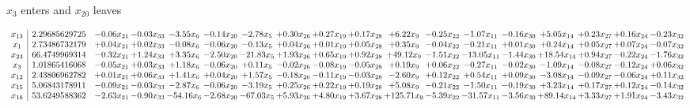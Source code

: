 \documentclass[9pt]{article}
\begin{document}
 $ x_{3} $ enters and $ x_{20} $ leaves 

 \[\begin{array}{c| c c@{\hskip 2pt} c@{\hskip 2pt} c@{\hskip 2pt} c@{\hskip 2pt} c@{\hskip 2pt} c@{\hskip 2pt} c@{\hskip 2pt} c@{\hskip 2pt} c@{\hskip 2pt} c@{\hskip 2pt} c@{\hskip 2pt} c@{\hskip 2pt} c@{\hskip 2pt} c@{\hskip 2pt} c@{\hskip 2pt} c@{\hskip 2pt} }
 x_{13}   &  2.29685629725 & -0.06 x_{21} & -0.03 x_{33} & -3.55 x_{6} & -0.14 x_{20} & -2.78 x_{5} & +  0.30 x_{26} & +  0.27 x_{19} & +  0.17 x_{28} & +  6.22 x_{9} & -0.25 x_{22} & -1.07 x_{11} & -0.16 x_{30} & +  5.05 x_{14} & +  0.23 x_{27} & +  0.16 x_{24} & -0.23 x_{32}\\
 x_{1}   &  2.73486732179 & +  0.04 x_{21} & +  0.02 x_{33} & -0.08 x_{6} & -0.06 x_{20} & -0.13 x_{5} & +  0.04 x_{26} & +  0.01 x_{19} & +  0.05 x_{28} & +  0.35 x_{9} & -0.04 x_{22} & -0.21 x_{11} & +  0.01 x_{30} & +  0.24 x_{14} & +  0.05 x_{27} & +  0.07 x_{24} & -0.07 x_{32}\\
 x_{23}   &  66.4749969314 & -0.32 x_{21} & +  1.24 x_{33} & +  3.35 x_{6} & -2.50 x_{20} & -21.83 x_{5} & +  1.93 x_{26} & +  0.65 x_{19} & +  0.92 x_{28} & + 49.12 x_{9} & -1.51 x_{22} & -13.05 x_{11} & -1.44 x_{30} & + 18.54 x_{14} & +  0.94 x_{27} & -0.22 x_{24} & -1.76 x_{32}\\
 x_{3}   &  1.01865416068 & -0.05 x_{21} & +  0.03 x_{33} & +  1.18 x_{6} & -0.06 x_{20} & +  0.11 x_{5} & -0.02 x_{26} & -0.08 x_{19} & -0.05 x_{28} & +  0.19 x_{9} & +  0.06 x_{22} & -0.27 x_{11} & -0.02 x_{30} & -1.09 x_{14} & -0.08 x_{27} & -0.12 x_{24} & +  0.06 x_{32}\\
 x_{12}   &  2.43806962782 & +  0.01 x_{21} & +  0.06 x_{33} & +  1.41 x_{6} & +  0.04 x_{20} & +  1.57 x_{5} & -0.18 x_{26} & -0.11 x_{19} & -0.03 x_{28} & -2.60 x_{9} & +  0.12 x_{22} & +  0.54 x_{11} & +  0.09 x_{30} & -3.08 x_{14} & -0.09 x_{27} & -0.06 x_{24} & +  0.11 x_{32}\\
 x_{15}   &  5.06843178911 & -0.09 x_{21} & -0.03 x_{33} & -2.87 x_{6} & -0.06 x_{20} & -3.19 x_{5} & +  0.25 x_{26} & +  0.22 x_{19} & +  0.19 x_{28} & +  5.08 x_{9} & -0.21 x_{22} & -1.50 x_{11} & -0.19 x_{30} & +  3.23 x_{14} & +  0.17 x_{27} & +  0.12 x_{24} & -0.14 x_{32}\\
 x_{18}   &  53.6249588362 & -2.63 x_{21} & -0.90 x_{33} & -54.16 x_{6} & -2.68 x_{20} & -67.03 x_{5} & +  5.93 x_{26} & +  4.80 x_{19} & +  3.67 x_{28} & + 125.71 x_{9} & -5.39 x_{22} & -31.57 x_{11} & -3.56 x_{30} & + 89.14 x_{14} & +  3.33 x_{27} & +  1.91 x_{24} & -3.43 x_{32}\\

\end{array}\]
\end{document}
